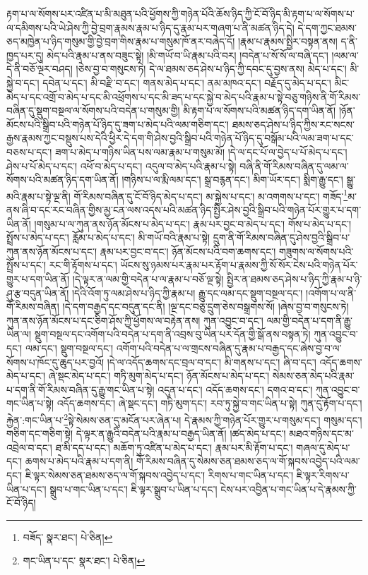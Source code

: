 རྟག་པ་ལ་སོགས་པར་འཛིན་པ་མི་མཐུན་པའི་ཕྱོགས་ཀྱི་གཉེན་པོའི་ཆོས་ཉིད་ཀྱི་ངོ་བོ་ཉིད་མི་རྟག་པ་ལ་སོགས་པ་ལ་དམིགས་པའི་ཡེ་ཤེས་ཀྱི་བྱེ་བྲག་རྣམས་རྣམ་པ་ཉིད་དུ་རྣམ་པར་གཞག་པ་ནི་མཚན་ཉིད་དེ། དེ་དག་ཀྱང་ཐམས་ཅད་མཁྱེན་པ་ཉིད་གསུམ་གྱི་བྱེ་བྲག་གིས་རྣམ་པ་གསུམ་ཁོ་ནར་བཞེད་དོ། །རྣམ་པ་རྣམས་སྤྱིར་བསྟན་ནས། ད་ནི་ཁྱད་པར་དུ། མེད་པའི་རྣམ་པ་ནས་བཟུང་སྟེ། །མི་གཡོ་བ་ཡི་རྣམ་པའི་བར། །བདེན་པ་སོ་སོ་ལ་བཞི་དང་། །ལམ་ལ་དེ་ནི་བཅོ་ལྔར་བཤད། །ཅེས་བྱ་བ་གསུངས་ཏེ། དེ་ལ་ཐམས་ཅད་ཤེས་པ་ཉིད་ཀྱི་དབང་དུ་བྱས་ནས། མེད་པ་དང་། མི་སྐྱེ་བ་དང་། དབེན་པ་དང་། མི་བརྫི་བ་དང་། གནས་མེད་པ་དང་། ནམ་མཁའ་དང་། བརྗོད་དུ་མེད་པ་དང་། མིང་མེད་པ་དང་འགྲོ་བ་མེད་པ་དང་མི་འཕྲོགས་པ་དང་མི་ཟད་པ་དང་སྐྱེ་བ་མེད་པའི་རྣམ་པ་སྟེ་བཅུ་གཉིས་ནི་གོ་རིམས་བཞིན་དུ་སྡུག་བསྔལ་ལ་སོགས་པའི་བདེན་པ་གསུམ་གྱི། མི་རྟག་པ་ལ་སོགས་པའི་མཚན་ཉིད་དག་ཡིན་ནོ། །ཉོན་མོངས་པའི་སྒྲིབ་པའི་གཉེན་པོ་ཉིད་དུ་ཟག་པ་མེད་པའི་ལམ་གཅིག་དང་། ཐམས་ཅད་ཤེས་པ་ཉིད་ཀྱིས་རང་སངས་རྒྱས་རྣམས་ཀྱང་བསྡུས་པས་དེའི་ཕྱིར་དེ་དག་གི་ཤེས་བྱའི་སྒྲིབ་པའི་གཉེན་པོ་ཉིད་དུ་བསྒོམ་པའི་ལམ་ཟག་པ་དང་བཅས་པ་དང་། ཟག་པ་མེད་པ་གཉིས་ཡིན་པས་ལམ་རྣམ་པ་གསུམ་མོ། །དེ་ལ་དང་པོ་ལ་བྱེད་པ་པོ་མེད་པ་དང་། ཤེས་པ་པོ་མེད་པ་དང་། འཕོ་བ་མེད་པ་དང་། འདུལ་བ་མེད་པའི་རྣམ་པ་སྟེ། བཞི་ནི་གོ་རིམས་བཞིན་དུ་ལམ་ལ་སོགས་པའི་མཚན་ཉིད་དག་ཡིན་ནོ། །གཉིས་པ་ལ་རྨི་ལམ་དང་། སྒྲ་བརྙན་དང་། མིག་ཡོར་དང་། སྨིག་རྒྱུ་དང་། སྒྱུ་མའི་རྣམ་པ་སྟེ་ལྔ་ནི། གོ་རིམས་བཞིན་དུ་ངོ་བོ་ཉིད་མེད་པ་དང་། མ་སྐྱེས་པ་དང་། མ་འགགས་པ་དང་། གཟོད་\footnote{བཟོད་  སྣར་ཐང་།  པེ་ཅིན། }མ་ནས་ཞི་བ་དང་རང་བཞིན་གྱིས་མྱ་ངན་ལས་འདས་པའི་མཚན་ཉིད་སྤྱིར་ཤེས་བྱའི་སྒྲིབ་པའི་གཉེན་པོར་གྱུར་པ་དག་ཡིན་ནོ། །གསུམ་པ་ལ་ཀུན་ནས་ཉོན་མོངས་པ་མེད་པ་དང་། རྣམ་པར་བྱང་བ་མེད་པ་དང་། གོས་པ་མེད་པ་དང་། སྤྲོས་པ་མེད་པ་དང་། རློམ་པ་མེད་པ་དང་། མི་གཡོ་བའི་རྣམ་པ་སྟེ། དྲུག་ནི་གོ་རིམས་བཞིན་དུ་ཤེས་བྱའི་སྒྲིབ་པ་ཀུན་ནས་ཉོན་མོངས་པ་དང་། རྣམ་པར་བྱང་བ་དང་། ཉོན་མོངས་པའི་བག་ཆགས་དང་། གཟུགས་ལ་སོགས་པའི་སྤྲོས་པ་དང་། རང་གི་རྟོགས་པ་དང་། ཡོངས་སུ་ཉམས་པར་རྣམ་པར་རྟོག་པ་རྣམས་ཀྱི་སོ་སོར་ངེས་པའི་གཉེན་པོར་གྱུར་པ་དག་ཡིན་ནོ། །དེ་ལྟར་ན་ལམ་གྱི་བདེན་པ་ལ་རྣམ་པ་བཅོ་ལྔ་སྟེ། སྤྱིར་ན་ཐམས་ཅད་ཤེས་པ་ཉིད་ཀྱི་རྣམ་པ་ཉི་ཤུ་རྩ་བདུན་ཡིན་ནོ། །དེའི་འོག་ཏུ་ལམ་ཤེས་པ་ཉིད་ཀྱི་རྣམ་པ། རྒྱུ་དང་ལམ་དང་སྡུག་བསྔལ་དང་། །འགོག་པ་ལ་ནི་གོ་རིམས་བཞིན། །དེ་དག་བརྒྱད་དང་བདུན་དང་ནི། །ལྔ་དང་བཅུ་དྲུག་ཅེས་བསྒྲགས་སོ། །ཞེས་བྱ་བ་གསུངས་ཏེ། ཀུན་ནས་ཉོན་མོངས་པ་དང་ཅིག་ཤོས་ཀྱི་ཕྱོགས་ལ་བརྟེན་ནས། ཀུན་འབྱུང་བ་དང་། ལམ་གྱི་བདེན་པ་དག་ནི་རྒྱུ་ཡིན་ལ། སྡུག་བསྔལ་དང་འགོག་པའི་བདེན་པ་དག་ནི་འབྲས་བུ་ཡིན་པར་དོན་གྱི་སྒོ་ནས་བསྟན་ཏེ། ཀུན་འབྱུང་བ་དང་། ལམ་དང་། སྡུག་བསྔལ་དང་། འགོག་པའི་བདེན་པ་ལ་གྲངས་བཞིན་དུ་རྣམ་པ་བརྒྱད་དང་ཞེས་བྱ་བ་ལ་སོགས་པ་ཁོང་དུ་ཆུད་པར་བྱའོ། །དེ་ལ་འདོད་ཆགས་དང་བྲལ་བ་དང་། མི་གནས་པ་དང་། ཞི་བ་དང་། འདོད་ཆགས་མེད་པ་དང་། ཞེ་སྡང་མེད་པ་དང་། གཏི་མུག་མེད་པ་དང་། ཉོན་མོངས་པ་མེད་པ་དང་། སེམས་ཅན་མེད་པའི་རྣམ་པ་དག་ནི་གོ་རིམས་བཞིན་དུ་རྒྱུ་གང་ཡིན་པ་སྟེ། འདུན་པ་དང་། འདོད་ཆགས་དང་། དགའ་བ་དང་། ཀུན་འབྱུང་བ་གང་ཡིན་པ་སྟེ། འདོད་ཆགས་དང་། ཞེ་སྡང་དང་། གཏི་མུག་དང་། རབ་ཏུ་སྐྱེ་བ་གང་ཡིན་པ་སྟེ། ཀུན་དུ་རྟོག་པ་དང་། རྐྱེན་:གང་ཡིན་པ་\footnote{གང་ཡིན་པ་དང་  སྣར་ཐང་།  པེ་ཅིན། }སྟེ་སེམས་ཅན་དུ་མངོན་པར་ཞེན་པ། དེ་རྣམས་ཀྱི་གཉེན་པོར་གྱུར་པ་གསུམ་དང་། གསུམ་དང་། གཅིག་དང་གཅིག་སྟེ། དེ་ལྟར་ན་རྒྱུའི་བདེན་པའི་རྣམ་པ་བརྒྱད་ཡིན་ནོ། །ཚད་མེད་པ་དང་། མཐའ་གཉིས་དང་མ་འབྲེལ་བ་དང་། ཐ་མི་དད་པ་དང་། མཆོག་ཏུ་འཛིན་པ་མེད་པ་དང་། རྣམ་པར་མི་རྟོག་པ་དང་། གཞལ་དུ་མེད་པ་དང་། ཆགས་པ་མེད་པའི་རྣམ་པ་དག་ནི། གོ་རིམས་བཞིན་དུ་སེམས་ཅན་ཐམས་ཅད་ལ་གོ་སྐབས་འབྱེད་པའི་ལམ་དང་། ཇི་ལྟར་སེམས་ཅན་ཐམས་ཅད་ལ་གོ་སྐབས་འབྱེད་པ་དང་། རིགས་པ་གང་ཡིན་པ་དང་། ཇི་ལྟར་རིགས་པ་ཡིན་པ་དང་། སྒྲུབ་པ་གང་ཡིན་པ་དང་། ཇི་ལྟར་སྒྲུབ་པ་ཡིན་པ་དང་། ངེས་པར་འབྱིན་པ་གང་ཡིན་པ་དེ་རྣམས་ཀྱི་ངོ་བོ་ཉིད། 